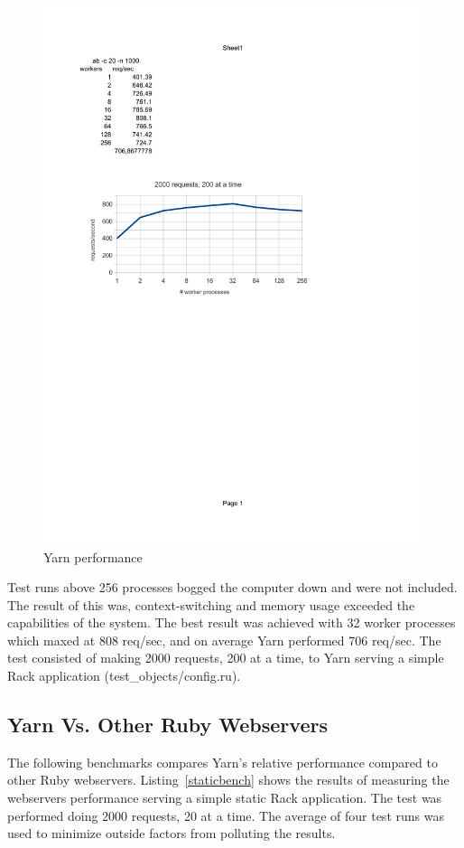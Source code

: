 \begin{figure}[htb]
  \centering
  \includegraphics[width=0.99\textwidth]{benchmark/optimal_workers_crop.pdf}
  \caption{Yarn performance}
  \label{optwork}
\end{figure}

Test runs above 256 processes bogged the computer down and were not included.
The result of this was, context-switching and memory usage exceeded the
capabilities of the system. The best result was achieved with 32 worker
processes which maxed at 808 req/sec, and on average Yarn performed 706 req/sec. The
test consisted of making 2000 requests, 200 at a time, to Yarn serving a
simple Rack application (test\_objects/config.ru).

\subsection{Yarn Vs. Other Ruby Webservers}
The following benchmarks compares Yarn's relative performance compared to
other Ruby webservers. Listing~\ref{staticbench} shows the results of
measuring the webservers performance serving a simple static Rack application.
The test was performed doing 2000 requests, 20 at a time. The average of four
test runs was used to minimize outside factors from polluting the results.

